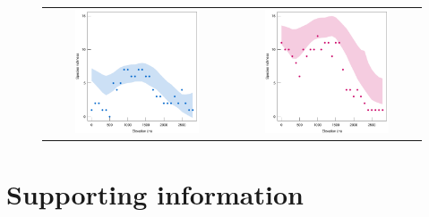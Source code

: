 \documentclass{article}
\begin{document}
\begin{figure}
\begin{tabular}{cc}
\includegraphics[width=0.7\textwidth]{figures/zoizos-Snatb}
&
\includegraphics[width=0.7\textwidth]{figures/zoizos-Sexob}
\end{tabular}
\caption{\label{Snull}}
\end{figure}

\clearpage
\section*{Supporting information}
\renewcommand{\thefigure}{S\arabic{figure}}
\setcounter{figure}{0}

\renewcommand{\thetable}{S\arabic{table}}
\setcounter{table}{0}

\end{document}
